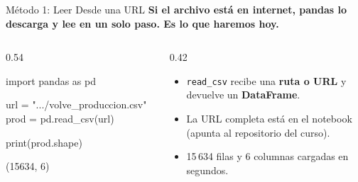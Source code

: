\documentclass[aspectratio=169, 11pt]{beamer}
\begin{document}
\begin{frame}[fragile,shrink=12]{Método 1: Leer Desde una URL}
  \vspace{-4pt}
  {\small\color{arcaDark}\bfseries
    Si el archivo está en internet, pandas lo descarga y lee en un solo paso. Es lo que haremos hoy.}

  \vspace{4pt}
  \begin{columns}[T]
    \begin{column}{0.54\textwidth}
      \begin{pyblock}
import pandas as pd

url = ".../volve_produccion.csv"
prod = pd.read_csv(url)

print(prod.shape)
      \end{pyblock}
      \vspace{2pt}
      \begin{outputblock}
(15634, 6)
      \end{outputblock}
    \end{column}

    \begin{column}{0.42\textwidth}
      {\scriptsize\color{textMuted}
      \begin{itemize}\setlength{\itemsep}{5pt}
        \item[{\color{arcaRed}\scriptsize\faArrowRight}]
          \texttt{read\_csv} recibe una \textbf{ruta o URL}
          y devuelve un \textbf{DataFrame}.
        \item[{\color{arcaRed}\scriptsize\faArrowRight}]
          La URL completa está en el notebook
          (apunta al repositorio del curso).
        \item[{\color{codeGreen}\scriptsize\faCheck}]
          15\,634 filas y 6 columnas cargadas
          en segundos.
      \end{itemize}
      }
    \end{column}
  \end{columns}
\end{frame}
\end{document}

